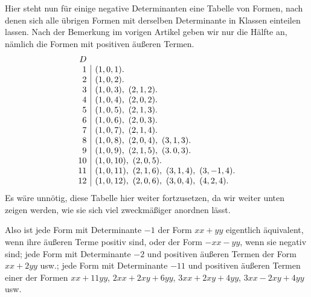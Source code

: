 Hier steht nun für einige negative Determinanten eine Tabelle von Formen, nach denen sich alle übrigen Formen mit derselben Determinante in Klassen einteilen lassen. Nach der Bemerkung im vorigen Artikel geben wir nur die Hälfte an, nämlich die Formen mit positiven äußeren Termen.
\[
\begin{array}{r|l}
\multicolumn{1}{r}{D}&\\
1&(1,0,1).\\
2&(1,0,2).\\
3&(1,0,3),\ (2,1,2).\\
4&(1,0,4),\ (2,0,2).\\
5&(1,0,5),\ (2,1,3).\\
6&(1,0,6),\ (2,0,3).\\
7&(1,0,7),\ (2,1,4).\\
8&(1,0,8),\ (2,0,4),\ (3,1,3).\\
9&(1,0,9),\ (2,1,5),\ (3.\,0,3).\\
10&(1,0,10),\ (2,0,5).\\
11&(1,0,11),\ (2,1,6),\ (3,1,4),\ (3,-1,4).\\
12&(1,0,12),\ (2,0,6),\ (3,0,4),\ (4,2,4).
\end{array}
\]
Es wäre unnötig, diese Tabelle hier weiter fortzusetzen, da wir weiter unten zeigen werden, wie sie sich viel zweckmäßiger anordnen lässt.

Also ist jede Form mit Determinante $-1$ der Form $xx+yy$ eigentlich äquivalent, wenn ihre äußeren Terme positiv sind, oder der Form $-xx-yy$, wenn sie negativ sind; jede Form mit Determinante $-2$ und positiven äußeren Termen der Form $xx+2yy$ usw.; jede Form mit Determinante $-11$ und positiven äußeren Termen einer der Formen $xx+11yy$, $2xx+2xy+6yy$, $3xx+2xy+4yy$, $3xx-2xy+4yy$ usw.

